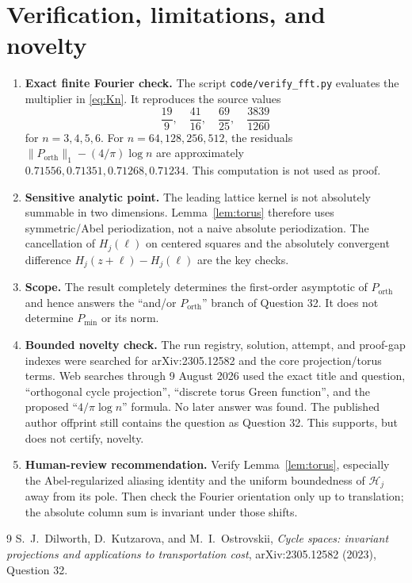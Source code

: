 \documentclass[11pt]{article}
\newcommand{\orth}{\mathrm{orth}}
\begin{document}
\section{Verification, limitations, and novelty}

\begin{enumerate}[leftmargin=*,itemsep=0.55em]
\item \textbf{Exact finite Fourier check.}
The script \texttt{code/verify\_fft.py} evaluates the multiplier in
\eqref{eq:Kn}.  It reproduces the source values
\[
 \frac{19}{9},\quad\frac{41}{16},\quad\frac{69}{25},\quad
 \frac{3839}{1260}
\]
for $n=3,4,5,6$.  For $n=64,128,256,512$, the residuals
$\|P_{\orth}\|_1-(4/\pi)\log n$ are approximately
$0.71556,0.71351,0.71268,0.71234$.  This computation is not used as proof.

\item \textbf{Sensitive analytic point.}
The leading lattice kernel is not absolutely summable in two dimensions.
Lemma~\ref{lem:torus} therefore uses symmetric/Abel periodization, not a
naive absolute periodization.  The cancellation of $H_j(\ell)$ on centered
squares and the absolutely convergent difference
$H_j(z+\ell)-H_j(\ell)$ are the key checks.

\item \textbf{Scope.}
The result completely determines the first-order asymptotic of
$P_{\orth}$ and hence answers the ``and/or $P_{\orth}$'' branch of
Question 32.  It does not determine $P_{\min}$ or its norm.

\item \textbf{Bounded novelty check.}
The run registry, solution, attempt, and proof-gap indexes were searched for
arXiv:2305.12582 and the core projection/torus terms.  Web searches through
9 August 2026 used the exact title and question, ``orthogonal cycle
projection'', ``discrete torus Green function'', and the proposed
``$4/\pi\log n$'' formula.  No later answer was found.  The published author
offprint still contains the question as Question 32.  This supports, but
does not certify, novelty.

\item \textbf{Human-review recommendation.}
Verify Lemma~\ref{lem:torus}, especially the Abel-regularized aliasing
identity and the uniform boundedness of $\mathcal H_j$ away from its pole.
Then check the Fourier orientation only up to translation; the absolute
column sum is invariant under those shifts.
\end{enumerate}

\begin{thebibliography}{9}
S.~J.~Dilworth, D.~Kutzarova, and M.~I.~Ostrovskii,
\emph{Cycle spaces: invariant projections and applications to transportation
cost}, arXiv:2305.12582 (2023), Question 32.
\end{thebibliography}
\end{document}
